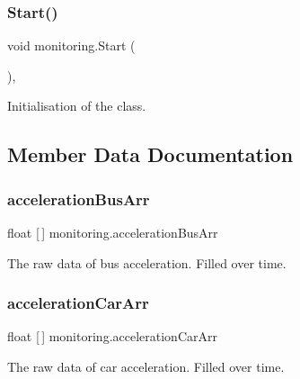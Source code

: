 \subsubsection{\texorpdfstring{Start()}{Start()}}
{\footnotesize\ttfamily void monitoring.\+Start (\begin{DoxyParamCaption}{ }\end{DoxyParamCaption})\hspace{0.3cm}{\ttfamily [inline]}, {\ttfamily [private]}}



Initialisation of the class. 



\subsection{Member Data Documentation}
\mbox{\label{classmonitoring_acf6692391e841215c8dbeec584100901}} 
\subsubsection{\texorpdfstring{acceleration\+Bus\+Arr}{accelerationBusArr}}
{\footnotesize\ttfamily float \mbox{[}$\,$\mbox{]} monitoring.\+acceleration\+Bus\+Arr\hspace{0.3cm}{\ttfamily [private]}}



The raw data of bus acceleration. Filled over time.

\mbox{\label{classmonitoring_a1dba43f12e646b6d346eaa1a406f6c68}} 
\subsubsection{\texorpdfstring{acceleration\+Car\+Arr}{accelerationCarArr}}
{\footnotesize\ttfamily float \mbox{[}$\,$\mbox{]} monitoring.\+acceleration\+Car\+Arr\hspace{0.3cm}{\ttfamily [private]}}



The raw data of car acceleration. Filled over time.

